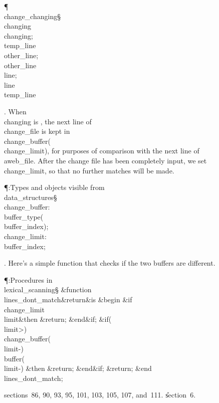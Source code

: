 \Y\P\4\D\\{change\_changing}\?\S\?\\{changing}\?\K\R\?\\{changing};\5
\\{temp\_line}\?\K\?\\{other\_line};\5
\\{other\_line}\?\K\?\\{line};\5
\\{line}\?\K\?\\{temp\_line}%
\par
\fi

. When \\{changing} is , the next line of \\{change\_file} is kept
in
\\{change\_buffer}\?(\?\to\?\\{change\_limit}\?)\?, for purposes of
comparison with the next
line of \\{aweb\_file}. After the change file has been completely input, we
set \\{change\_limit}\?\K{}, so that no further matches will be made.

\Y\P\?\4:Types and objects visible from \\{data\_structures}\X\mathrel{+}\S%
\?\6
\\{change\_buffer}\?:\?\\{buffer\_type}\?\1(\?\\{buffer\_index}\?\2)\?;\6
\\{change\_limit}\?:\?\\{buffer\_index};\par
\fi

. Here's a simple function that checks if the two buffers are different.

\Y\P\?\4:Procedures in \\{lexical\_scanning}\X\S\?\6
\&{function}\8\1\\{lines\_dont\_match}\?\8\&{return}\?\8\2\8\&{is}\8%
\1\6
\4\&{begin}\6
\&{if}\1\1\8\\{change\_limit}\?\I\?\\{limit}\2\8\&{then}\6
\?\&{return}\?\8;\2\6
\&{end}\8\2\&{if}\1;\6
\&{if}\1\1\?\8\1(\?\\{limit}\?>\?\2)\ANT\?\\{change\_buffer}\?\1(\?\to\?%
\\{limit}\?-\?\2)\I\?\\{buffer}\?\1(\?\to\?\\{limit}\?-\?\2)\?\2\8%
\&{then}\6
\?\&{return}\?\8;\2\6
\&{end}\8\2\&{if}\1;\6
\?\&{return}\?\8;\2\6
\&{end}\8\\{lines\_dont\_match};\par
\A sections~86, 90, 93, 95, 101, 103, 105, 107, and~111.
\U section~6\*.\fi

